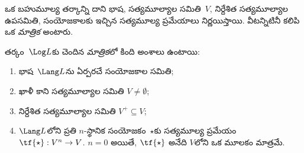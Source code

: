 \documentclass[../../../include/open-logic-section]{subfiles}
\begin{document}


ఒక బహుమూల్య తర్కాన్ని దాని భాష, సత్యమూల్యాల సమితి~$V$,
నిర్దేశిత సత్యమూల్యాల ఉపసమితి, సంయోజకాలకు
ఇచ్చిన సత్యమూల్య ప్రమేయాలు నిర్ణయిస్తాయి. వీటన్నిటినీ కలిపి
ఒక \emph{మాత్రిక} అంటారు.

\begin{defn}[మాత్రిక]
తర్కం~$\Log L$కు చెందిన \emph{మాత్రిక}లో కింది అంశాలు ఉంటాయి:
\begin{enumerate}
\item భాష~$\Lang L$ను ఏర్పరచే సంయోజకాల సమితి;
\item ఖాళీ కాని సత్యమూల్యాల సమితి $V \neq \emptyset$;
\item నిర్దేశిత సత్యమూల్యాల సమితి $V^+ \subseteq V$;
\item $\Lang L$లోని ప్రతి $n$-స్థానిక సంయోజకం~$\star$కు
సత్యమూల్య ప్రమేయం~$\tf{\star} : V^n \to V$.
$n = 0$ అయితే, $\tf{\star}$ అనేది $V$లోని ఒక మూలకం మాత్రమే.
\end{enumerate}
\end{defn}
\end{document}
